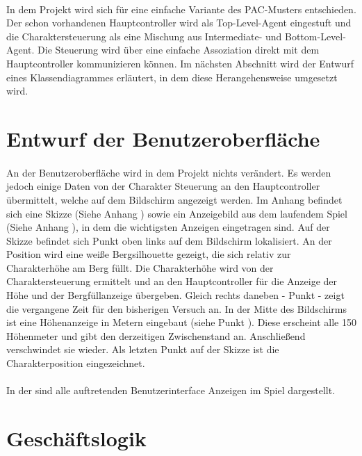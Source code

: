 \paragraph{}
In dem Projekt wird sich für eine einfache Variante des PAC-Musters entschieden. Der schon vorhandenen Hauptcontroller wird als Top-Level-Agent eingestuft und die Charaktersteuerung als eine Mischung aus Intermediate- und Bottom-Level-Agent. Die Steuerung wird über eine einfache Assoziation direkt mit dem Hauptcontroller kommunizieren können. Im nächsten Abschnitt wird der Entwurf eines Klassendiagrammes erläutert, in dem diese Herangehensweise umgesetzt wird.

\section{Entwurf der Benutzeroberfläche}
\paragraph{}
An der Benutzeroberfläche wird in dem Projekt nichts verändert. Es werden jedoch einige Daten von der Charakter Steuerung an den Hauptcontroller übermittelt, welche auf dem Bildschirm angezeigt werden. Im Anhang befindet sich eine Skizze (Siehe Anhang ) sowie ein Anzeigebild aus dem laufendem Spiel (Siehe Anhang ), in dem die wichtigsten Anzeigen eingetragen sind. Auf der Skizze befindet sich Punkt  oben links auf dem Bildschirm lokalisiert. An der Position wird eine weiße Bergsilhouette gezeigt, die sich relativ zur Charakterhöhe am Berg füllt. Die Charakterhöhe wird von der Charaktersteuerung ermittelt und an den Hauptcontroller für die Anzeige der Höhe und der Bergfüllanzeige übergeben. Gleich rechts daneben - Punkt  - zeigt die vergangene Zeit für den bisherigen Versuch an. In der Mitte des Bildschirms ist eine Höhenanzeige in Metern eingebaut (siehe Punkt ). Diese erscheint alle 150 Höhenmeter und gibt den derzeitigen Zwischenstand an. Anschließend verschwindet sie wieder. Als letzten Punkt auf der Skizze ist die Charakterposition eingezeichnet.
\paragraph{}
In der  sind alle auftretenden Benutzerinterface Anzeigen im Spiel dargestellt.

\section{Geschäftslogik}
\label{Geschaeftslogik}
